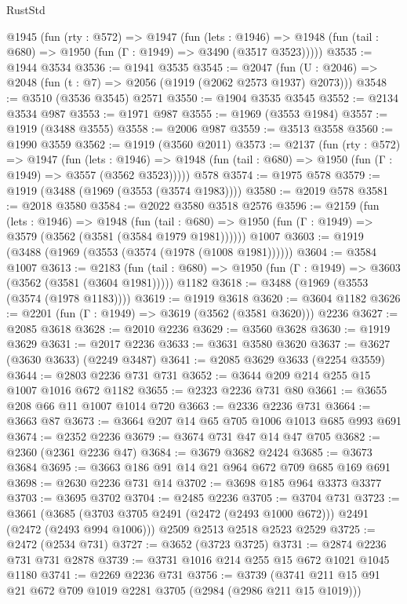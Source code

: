 \begin{lexlean}{RustStd}
\begin{coremodule}
  @1945
    (fun (rty : @572) =>
    @1947
      (fun (lets : @1946) =>
      @1948 (fun (tail : @680) => @1950 (fun (Γ : @1949) => @3490 (@3517 @3523)))))
@3535 := @1944 @3534
@3536 := @1941 @3535
@3545 := @2047 (fun (U : @2046) => @2048 (fun (t : @7) => @2056 (@1919 (@2062 @2573 @1937) @2073)))
@3548 := @3510 (@3536 @3545) @2571
@3550 := @1904 @3535 @3545
@3552 := @2134 @3534 @987
@3553 := @1971 @987
@3555 := @1969 (@3553 @1984)
@3557 := @1919 (@3488 @3555)
@3558 := @2006 @987
@3559 := @3513 @3558
@3560 := @1990 @3559
@3562 := @1919 (@3560 @2011)
@3573 := @2137
    (fun (rty : @572) =>
    @1947
      (fun (lets : @1946) =>
      @1948 (fun (tail : @680) => @1950 (fun (Γ : @1949) => @3557 (@3562 @3523)))))
    @578
@3574 := @1975 @578
@3579 := @1919 (@3488 (@1969 (@3553 (@3574 @1983))))
@3580 := @2019 @578
@3581 := @2018 @3580
@3584 := @2022 @3580 @3518 @2576
@3596 := @2159
    (fun (lets : @1946) =>
    @1948
      (fun (tail : @680) => @1950 (fun (Γ : @1949) => @3579 (@3562 (@3581 (@3584 @1979 @1981))))))
    @1007
@3603 := @1919 (@3488 (@1969 (@3553 (@3574 (@1978 (@1008 @1981))))))
@3604 := @3584 @1007
@3613 := @2183
    (fun (tail : @680) => @1950 (fun (Γ : @1949) => @3603 (@3562 (@3581 (@3604 @1981)))))
    @1182
@3618 := @3488 (@1969 (@3553 (@3574 (@1978 @1183))))
@3619 := @1919 @3618
@3620 := @3604 @1182
@3626 := @2201 (fun (Γ : @1949) => @3619 (@3562 (@3581 @3620))) @2236
@3627 := @2085 @3618
@3628 := @2010 @2236
@3629 := @3560 @3628
@3630 := @1919 @3629
@3631 := @2017 @2236
@3633 := @3631 @3580 @3620
@3637 := @3627 (@3630 @3633) (@2249 @3487)
@3641 := @2085 @3629 @3633 (@2254 @3559)
@3644 := @2803 @2236 @731 @731
@3652 := @3644 @209 @214 @255 @15 @1007 @1016 @672 @1182
@3655 := @2323 @2236 @731 @80
@3661 := @3655 @208 @66 @11 @1007 @1014 @720
@3663 := @2336 @2236 @731
@3664 := @3663 @87
@3673 := @3664 @207 @14 @65 @705 @1006 @1013 @685 @993 @691
@3674 := @2352 @2236
@3679 := @3674 @731 @47 @14 @47 @705
@3682 := @2360 (@2361 @2236 @47)
@3684 := @3679 @3682 @2424
@3685 := @3673 @3684
@3695 := @3663 @186 @91 @14 @21 @964 @672 @709 @685 @169 @691
@3698 := @2630 @2236 @731 @14
@3702 := @3698 @185 @964 @3373 @3377
@3703 := @3695 @3702
@3704 := @2485 @2236
@3705 := @3704 @731
@3723 := @3661
    (@3685 (@3703 @3705 @2491 (@2472 (@2493 @1000 @672))) @2491 (@2472 (@2493 @994 @1006)))
    @2509
    @2513
    @2518
    @2523
    @2529
@3725 := @2472 (@2534 @731)
@3727 := @3652 (@3723 @3725)
@3731 := @2874 @2236 @731 @731 @2878
@3739 := @3731 @1016 @214 @255 @15 @672 @1021 @1045 @1180
@3741 := @2269 @2236 @731
@3756 := @3739 (@3741 @211 @15 @91 @21 @672 @709 @1019 @2281 @3705 (@2984 (@2986 @211 @15 @1019)))

\end{coremodule}
\end{lexlean}
